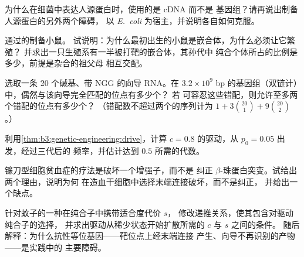 \begin{exercise}[$\star\star$]\label{exo:b3:genetic-engineering:6}
为什么在细菌中表达人源蛋白时，使用的是 cDNA 而不是
基因组？请再说出制备人源蛋白的另外两个障碍，
以 \emph{E.~coli} 为宿主，并说明各自如何克服。
\end{exercise}

\begin{exercise}[$\star\star$]\label{exo:b3:genetic-engineering:7}
通过的制备小鼠。
试说明：为什么最初出生的小鼠是嵌合体，为什么必须让它繁殖？
并求出一只生殖系有一半被打靶的嵌合体，其孙代中
纯合个体所占的比例是多少，前提是杂合的祖父母
相互交配。
\end{exercise}

\begin{exercise}[$\star\star$]\label{exo:b3:genetic-engineering:8}
选取一条 20 个碱基、带 NGG  的向导 RNA。在
$3.2\times 10^{9}$ bp 的基因组（双链计）中，偶然与该向导完全匹配的位点有多少个？
若  可容忍这些错配，则允许至多两个错配的位点有多少个？
（错配数不超过两个的序列计为 $1 + 3\binom{20}{1} +
9\binom{20}{2}$。）
\end{exercise}

\begin{exercise}[$\star\star$]\label{exo:b3:genetic-engineering:9}
利用\cref{thm:b3:genetic-engineering:drive}，计算
$c = 0.8$ 的驱动，从 $p_{0} = 0.05$ 出发，经过三代后的
频率，并估计达到 $0.5$ 所需的代数。
\end{exercise}

\begin{exercise}[$\star\star\star$]\label{exo:b3:genetic-engineering:10}
镰刀型细胞贫血症的疗法是破坏一个增强子，而不是
纠正 $\beta$-珠蛋白突变。试给出两个理由，说明为何
在造血干细胞中选择末端连接破坏，而不是纠正，
并给出一个缺点。
\end{exercise}

\begin{exercise}[$\star\star\star$]\label{exo:b3:genetic-engineering:11}
针对蚊子的一种在纯合子中携带适合度代价 $s$，
修改递推关系，使其包含对驱动纯合子的选择，
并求出驱动从稀少状态开始扩散所需的 $c$ 与 $s$ 之间的条件。
随后解释：为什么抗性等位基因——靶位点上经末端连接
产生、向导不再识别的产物——是实践中的
主要障碍。
\end{exercise}

